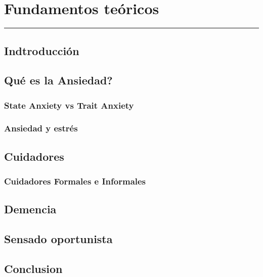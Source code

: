 \chapter{Fundamentos te\'oricos}\label{capit:cap2}
\vspace{-2.0325ex}%
\noindent
\rule{\textwidth}{0.5pt}
\vspace{-5.5ex}%
\newcommand{\pushline}{\Indp}%

\section{Indtroducci\'on}\label{secc:introduccion}
\section{Qu\'e es la Ansiedad?}\label{secc:ansiedad}
\subsection{State Anxiety vs Trait Anxiety}\label{secc:anxieystatevstrait}
\subsection{Ansiedad y estr\'es}\label{secc:anxietyandstress}
\section{Cuidadores}\label{secc:caregivers}
\subsection{Cuidadores Formales e Informales}\label{secc:caregivers}
\section{Demencia}\label{secc:dementia}
\section{Sensado oportunista}\label{secc:dementia}
\section{Conclusion}\label{secc:conclution}



\newpage
